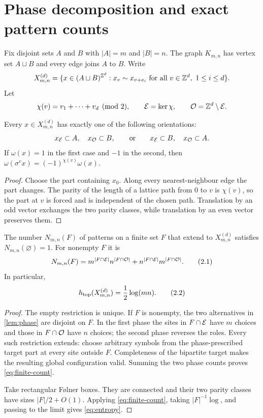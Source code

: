 \section{Phase decomposition and exact pattern counts}\label{sec:phase}

Fix disjoint sets $A$ and $B$ with $|A|=m$ and $|B|=n$.  The graph
$K_{m,n}$ has vertex set $A\sqcup B$ and every edge joins $A$ to $B$.  Write
\[
 X_{m,n}^{(d)}=\{x\in(A\sqcup B)^{\mathbb Z^d}:x_v\sim x_{v+e_i}
 \text{ for all }v\in\mathbb Z^d,\ 1\leq i\leq d\}.
\]
Let
\[
 \chi(v)=v_1+\cdots+v_d\pmod 2,
 \qquad \mathcal E=\ker\chi,
 \qquad \mathcal O=\mathbb Z^d\setminus\mathcal E.
\]

\begin{lemma}\label{lem:phase}
Every $x\in X_{m,n}^{(d)}$ has exactly one of the following orientations:
\[
x_{\mathcal E}\subset A,\quad x_{\mathcal O}\subset B,
\qquad\text{or}\qquad
x_{\mathcal E}\subset B,\quad x_{\mathcal O}\subset A.
\]
If $\omega(x)=1$ in the first case and $-1$ in the second, then
$\omega(\sigma^v x)=(-1)^{\chi(v)}\omega(x)$.
\end{lemma}

\begin{proof}
Choose the part containing $x_0$.  Along every nearest-neighbour edge the
part changes.  The parity of the length of a lattice path from $0$ to $v$ is
$\chi(v)$, so the part at $v$ is forced and is independent of the chosen
path.  Translation by an odd vector exchanges the two parity classes, while
translation by an even vector preserves them.
\end{proof}

\begin{proposition}\label{prop:patterns}
The number $N_{m,n}(F)$ of patterns on a finite set $F$ that extend to
$X_{m,n}^{(d)}$ satisfies $N_{m,n}(\varnothing)=1$.  For nonempty $F$ it is
\[
 N_{m,n}(F)=
 m^{|F\cap\mathcal E|}n^{|F\cap\mathcal O|}
 +n^{|F\cap\mathcal E|}m^{|F\cap\mathcal O|}.
 \tag{2.1}\label{eq:finite-count}
\]
In particular,
\[
 h_{\rm top}(X_{m,n}^{(d)})=\frac12\log(mn).
 \tag{2.2}\label{eq:entropy}
\]
\end{proposition}

\begin{proof}
The empty restriction is unique.  If $F$ is nonempty, the two alternatives
in \cref{lem:phase} are disjoint on $F$.  In the first phase the sites in
$F\cap\mathcal E$ have $m$ choices and those in $F\cap\mathcal O$ have $n$ choices; the
second phase reverses the roles.  Every such restriction extends: choose
arbitrary symbols from the phase-prescribed target part at every site outside
$F$.  Completeness of the bipartite target makes the resulting global
configuration valid.  Summing the two phase counts proves
\eqref{eq:finite-count}.

Take rectangular Følner boxes.  They are connected and their two parity
classes have sizes $|F|/2+O(1)$.  Applying \eqref{eq:finite-count}, taking
$|F|^{-1}\log$, and passing to the limit gives \eqref{eq:entropy}.
\end{proof}

